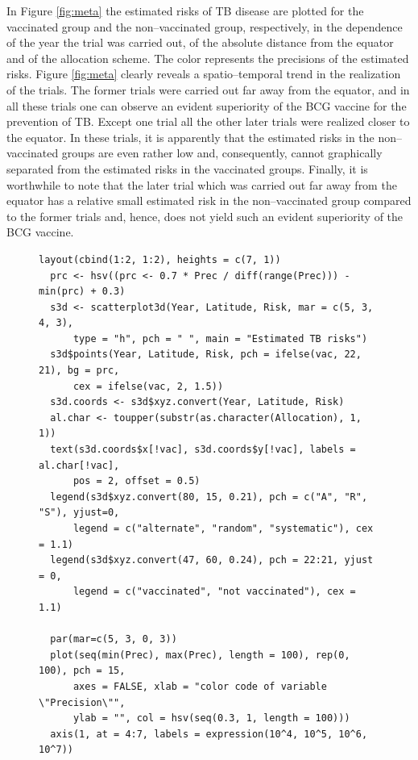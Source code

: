 In Figure \ref{fig:meta} the estimated risks of TB disease are plotted for the
vaccinated group and the non--vaccinated group, respectively, in the
dependence of the year the trial was carried out, of the absolute distance
from the equator and of the allocation scheme.
The color represents the precisions of the estimated risks.
Figure \ref{fig:meta} clearly reveals a spatio--temporal trend in the realization of the trials.
The former trials were carried out far away from the equator,
and in all these trials one can observe an evident superiority of the BCG vaccine for the prevention of TB.
Except one trial all the other later trials were realized closer to the equator.
In these trials, it is apparently that the estimated risks in the non--vaccinated groups are even rather low and,
consequently, cannot graphically separated from the estimated risks in the vaccinated groups.
Finally, it is worthwhile to note that the later trial which was carried out far away from the equator
has a relative small estimated risk in the non--vaccinated group compared to the former trials and, hence,
does not yield such an evident superiority of the BCG vaccine.

\begin{figure}[b!]
\small
\begin{Verbatim}[frame=single]
  layout(cbind(1:2, 1:2), heights = c(7, 1))
  prc <- hsv((prc <- 0.7 * Prec / diff(range(Prec))) - min(prc) + 0.3)
  s3d <- scatterplot3d(Year, Latitude, Risk, mar = c(5, 3, 4, 3),
      type = "h", pch = " ", main = "Estimated TB risks")
  s3d$points(Year, Latitude, Risk, pch = ifelse(vac, 22, 21), bg = prc,
      cex = ifelse(vac, 2, 1.5))
  s3d.coords <- s3d$xyz.convert(Year, Latitude, Risk)
  al.char <- toupper(substr(as.character(Allocation), 1, 1))
  text(s3d.coords$x[!vac], s3d.coords$y[!vac], labels = al.char[!vac],
      pos = 2, offset = 0.5)
  legend(s3d$xyz.convert(80, 15, 0.21), pch = c("A", "R", "S"), yjust=0,
      legend = c("alternate", "random", "systematic"), cex = 1.1)
  legend(s3d$xyz.convert(47, 60, 0.24), pch = 22:21, yjust = 0,
      legend = c("vaccinated", "not vaccinated"), cex = 1.1)

  par(mar=c(5, 3, 0, 3))
  plot(seq(min(Prec), max(Prec), length = 100), rep(0, 100), pch = 15,
      axes = FALSE, xlab = "color code of variable \"Precision\"",
      ylab = "", col = hsv(seq(0.3, 1, length = 100)))
  axis(1, at = 4:7, labels = expression(10^4, 10^5, 10^6, 10^7))
\end{Verbatim}
\end{figure}
\normalsize


